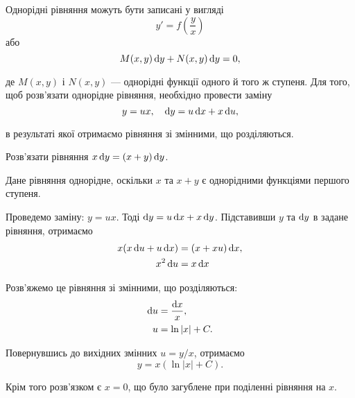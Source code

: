 Однорідні рівняння можуть бути записані у вигляді \[y' = f \left( \frac{y}{x} \right)\] або \[ M(x, y)\mathop{}\!\mathrm{d} y + N(x, y) \mathop{}\!\mathrm{d} y = 0, \] 

де $M(x, y)$ і $N(x, y)$ --- однорідні функції одного й того ж ступеня. Для того, щоб розв'язати однорідне рівняння, необхідно провести заміну \[y = u x, \quad \mathop{}\!\mathrm{d} y = u \mathop{}\!\mathrm{d} x + x \mathop{}\!\mathrm{d} u,\] 

в результаті якої отримаємо рівняння зі змінними, що розділяються. 

\begin{example}
	Розв'язати рівняння $x \mathop{}\!\mathrm{d} y = (x + y) \mathop{}\!\mathrm{d} y$. 
\end{example}

\begin{solution}
	Дане рівняння однорідне, оскільки $x$ та $x + y$ є однорідними функціями першого ступеня. \parvskip

	Проведемо заміну: $y = u x$. Тоді $\mathop{}\!\mathrm{d} y = u \mathop{}\!\mathrm{d} x + x \mathop{}\!\mathrm{d} y$. Підставивши $y$ та $\mathop{}\!\mathrm{d} y$ в задане рівняння, отримаємо 
	\begin{align*}
		x (x \mathop{}\!\mathrm{d} u + u \mathop{}\!\mathrm{d} x) &= (x + x u) \mathop{}\!\mathrm{d} x, \\
		x^2 \mathop{}\!\mathrm{d} u &= x \mathop{}\!\mathrm{d} x
	\end{align*}

	Розв'яжемо це рівняння зі змінними, що розділяються:
	\begin{align*}
		\mathop{}\!\mathrm{d} u &= \frac{\mathop{}\!\mathrm{d} x}{x}, \\
		u &= \ln |x| + C.
	\end{align*}

	Повернувшись до вихідних змінних $u = y / x$, отримаємо \[y = x (\ln |x| + C).\] 

	Крім того розв'язком є $x = 0$, що було загублене при поділенні рівняння на $x$.
\end{solution}

